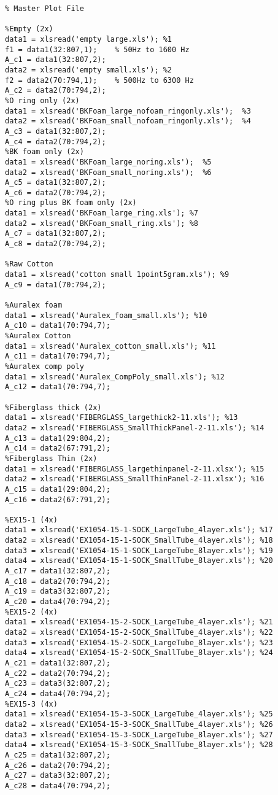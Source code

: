 \begin{verbatim}
% Master Plot File

%Empty (2x)
data1 = xlsread('empty large.xls'); %1
f1 = data1(32:807,1);    % 50Hz to 1600 Hz
A_c1 = data1(32:807,2);
data2 = xlsread('empty small.xls'); %2
f2 = data2(70:794,1);    % 500Hz to 6300 Hz
A_c2 = data2(70:794,2);
%O ring only (2x)
data1 = xlsread('BKFoam_large_nofoam_ringonly.xls');  %3
data2 = xlsread('BKFoam_small_nofoam_ringonly.xls');  %4
A_c3 = data1(32:807,2);
A_c4 = data2(70:794,2);
%BK foam only (2x)
data1 = xlsread('BKFoam_large_noring.xls');  %5
data2 = xlsread('BKFoam_small_noring.xls');  %6
A_c5 = data1(32:807,2);
A_c6 = data2(70:794,2);
%O ring plus BK foam only (2x)
data1 = xlsread('BKFoam_large_ring.xls'); %7
data2 = xlsread('BKFoam_small_ring.xls'); %8
A_c7 = data1(32:807,2);
A_c8 = data2(70:794,2);

%Raw Cotton
data1 = xlsread('cotton small 1point5gram.xls'); %9
A_c9 = data1(70:794,2);

%Auralex foam
data1 = xlsread('Auralex_foam_small.xls'); %10
A_c10 = data1(70:794,7);
%Auralex Cotton
data1 = xlsread('Auralex_cotton_small.xls'); %11
A_c11 = data1(70:794,7);
%Auralex comp poly
data1 = xlsread('Auralex_CompPoly_small.xls'); %12
A_c12 = data1(70:794,7);

%Fiberglass thick (2x)
data1 = xlsread('FIBERGLASS_largethick2-11.xls'); %13
data2 = xlsread('FIBERGLASS_SmallThickPanel-2-11.xls'); %14
A_c13 = data1(29:804,2);
A_c14 = data2(67:791,2);
%Fiberglass Thin (2x)
data1 = xlsread('FIBERGLASS_largethinpanel-2-11.xlsx'); %15
data2 = xlsread('FIBERGLASS_SmallThinPanel-2-11.xlsx'); %16
A_c15 = data1(29:804,2);
A_c16 = data2(67:791,2);

%EX15-1 (4x)
data1 = xlsread('EX1054-15-1-SOCK_LargeTube_4layer.xls'); %17
data2 = xlsread('EX1054-15-1-SOCK_SmallTube_4layer.xls'); %18
data3 = xlsread('EX1054-15-1-SOCK_LargeTube_8layer.xls'); %19
data4 = xlsread('EX1054-15-1-SOCK_SmallTube_8layer.xls'); %20
A_c17 = data1(32:807,2);
A_c18 = data2(70:794,2);
A_c19 = data3(32:807,2);
A_c20 = data4(70:794,2);
%EX15-2 (4x)
data1 = xlsread('EX1054-15-2-SOCK_LargeTube_4layer.xls'); %21
data2 = xlsread('EX1054-15-2-SOCK_SmallTube_4layer.xls'); %22
data3 = xlsread('EX1054-15-2-SOCK_LargeTube_8layer.xls'); %23
data4 = xlsread('EX1054-15-2-SOCK_SmallTube_8layer.xls'); %24
A_c21 = data1(32:807,2);
A_c22 = data2(70:794,2);
A_c23 = data3(32:807,2);
A_c24 = data4(70:794,2);
%EX15-3 (4x)
data1 = xlsread('EX1054-15-3-SOCK_LargeTube_4layer.xls'); %25
data2 = xlsread('EX1054-15-3-SOCK_SmallTube_4layer.xls'); %26
data3 = xlsread('EX1054-15-3-SOCK_LargeTube_8layer.xls'); %27
data4 = xlsread('EX1054-15-3-SOCK_SmallTube_8layer.xls'); %28
A_c25 = data1(32:807,2);
A_c26 = data2(70:794,2);
A_c27 = data3(32:807,2);
A_c28 = data4(70:794,2);


\end{verbatim}
